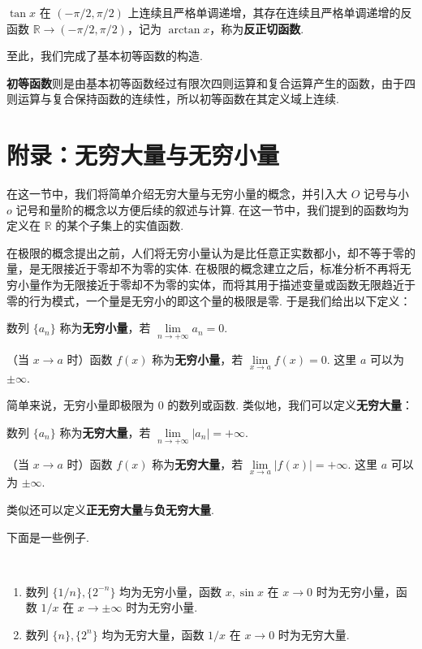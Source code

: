 \documentclass[../main.tex]{subfiles}
\begin{document}
$\tan x$ 在 $(-\pi/2, \pi/2)$ 上连续且严格单调递增，其存在连续且严格单调递增的反函数 $\mathbb R \to (-\pi/2, \pi/2)$，记为 $\arctan x$，称为\textbf{反正切函数}. 

至此，我们完成了基本初等函数的构造. 

\textbf{初等函数}则是由基本初等函数经过有限次四则运算和复合运算产生的函数，由于四则运算与复合保持函数的连续性，所以初等函数在其定义域上连续. 


\section{附录：无穷大量与无穷小量}

在这一节中，我们将简单介绍无穷大量与无穷小量的概念，并引入大 $O$ 记号与小 $o$ 记号和量阶的概念以方便后续的叙述与计算. 在这一节中，我们提到的函数均为定义在 $\mathbb R$ 的某个子集上的实值函数. 

在极限的概念提出之前，人们将无穷小量认为是比任意正实数都小，却不等于零的量，是无限接近于零却不为零的实体. 在极限的概念建立之后，标准分析不再将无穷小量作为无限接近于零却不为零的实体，而将其用于描述变量或函数无限趋近于零的行为模式，一个量是无穷小的即这个量的极限是零. 于是我们给出以下定义：

\begin{definition}[无穷小量的定义] 
    数列 $\{a_n\}$ 称为\textbf{无穷小量}，若 $\lim\limits_{n \to +\infty} a_n = 0$. 

    （当 $x \to a$ 时）函数 $f(x)$ 称为\textbf{无穷小量}，若 $\lim\limits_{x \to a} f(x) = 0$. 这里 $a$ 可以为 $\pm\infty$. 
\end{definition}

简单来说，无穷小量即极限为 0 的数列或函数. 类似地，我们可以定义\textbf{无穷大量}：

\begin{definition}[无穷大量的定义] 
    数列 $\{a_n\}$ 称为\textbf{无穷大量}，若 $\lim\limits_{n \to +\infty} |a_n| = +\infty$. 

    （当 $x \to a$ 时）函数 $f(x)$ 称为\textbf{无穷大量}，若 $\lim\limits_{x \to a} |f(x)| = +\infty$. 这里 $a$ 可以为 $\pm\infty$. 
\end{definition}

类似还可以定义\textbf{正无穷大量}与\textbf{负无穷大量}. 

下面是一些例子. 

\begin{example}[无穷小量与无穷大量的例子]
    \ 
    \begin{enumerate}[label = (\alph*)]
        \item 数列 $\{1 / n\}, \{2^{-n}\}$ 均为无穷小量，函数 $x, \sin x$ 在 $x \to 0$ 时为无穷小量，函数 $1 / x$ 在 $x \to \pm\infty$ 时为无穷小量. 
        \item 数列 $\{n\}, \{2^n\}$ 均为无穷大量，函数 $1 / x$ 在 $x \to 0$ 时为无穷大量. 
    \end{enumerate}
\end{example}
\end{document}
